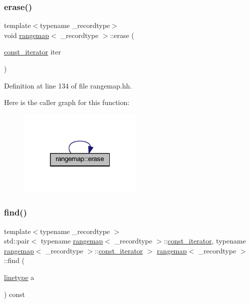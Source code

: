 \subsubsection{\texorpdfstring{erase()}{erase()}\hspace{0.1cm}{\footnotesize\ttfamily [2/2]}}
{\footnotesize\ttfamily template$<$typename \+\_\+recordtype$>$ \\
void \mbox{\hyperlink{classrangemap}{rangemap}}$<$ \+\_\+recordtype $>$\+::erase (\begin{DoxyParamCaption}\item[{\mbox{\hyperlink{classrangemap_affa7462e68d053d3a066fe0b8d46a99d}{const\+\_\+iterator}}}]{iter }\end{DoxyParamCaption})\hspace{0.3cm}{\ttfamily [inline]}}



Definition at line 134 of file rangemap.\+hh.

Here is the caller graph for this function\+:
\nopagebreak
\begin{figure}[H]
\begin{center}
\leavevmode
\includegraphics[width=169pt]{classrangemap_a5c92c4941f0220511dcb911c0b223211_icgraph}
\end{center}
\end{figure}
\mbox{\label{classrangemap_a1a9e4bf2a0972dd23183e55bd3f40f49}} 
\subsubsection{\texorpdfstring{find()}{find()}\hspace{0.1cm}{\footnotesize\ttfamily [1/2]}}
{\footnotesize\ttfamily template$<$typename \+\_\+recordtype $>$ \\
std\+::pair$<$ typename \mbox{\hyperlink{classrangemap}{rangemap}}$<$ \+\_\+recordtype $>$\+::\mbox{\hyperlink{classrangemap_affa7462e68d053d3a066fe0b8d46a99d}{const\+\_\+iterator}}, typename \mbox{\hyperlink{classrangemap}{rangemap}}$<$ \+\_\+recordtype $>$\+::\mbox{\hyperlink{classrangemap_affa7462e68d053d3a066fe0b8d46a99d}{const\+\_\+iterator}} $>$ \mbox{\hyperlink{classrangemap}{rangemap}}$<$ \+\_\+recordtype $>$\+::find (\begin{DoxyParamCaption}\item[{\mbox{\hyperlink{classrangemap_a54c8f7622f9af4c4232d764cf9ed11fa}{linetype}}}]{a }\end{DoxyParamCaption}) const}



